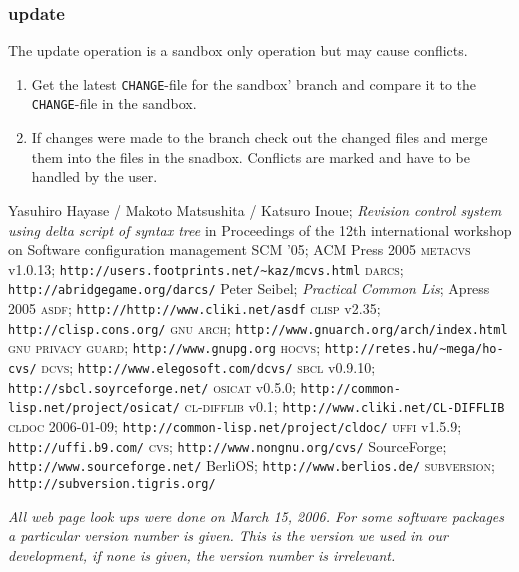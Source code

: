 \documentclass[fleqn, 10pt, a4paper]{report} \usepackage{amssymb}
\begin{document}
\subsubsection{update}

The update operation is a sandbox only operation but may cause
conflicts.

\begin{enumerate}
\item Get the latest \texttt{CHANGE}-file for the sandbox' branch and
  compare it to the \texttt{CHANGE}-file in the sandbox.
\item If changes were made to the branch check out the changed files
  and merge them into the files in the snadbox. Conflicts are marked
  and have to be handled by the user.
\end{enumerate}


\begin{thebibliography}{Clis06}
 Yasuhiro Hayase / Makoto Matsushita / Katsuro
  Inoue; \emph{Revision control system using delta script of syntax
    tree} in Proceedings of the 12th international workshop on
  Software configuration management SCM '05; ACM Press 2005
 \textsc{metacvs} v1.0.13;
  \texttt{http://users.footprints.net/\textasciitilde{}kaz/mcvs.html}
 \textsc{darcs};
  \texttt{http://abridgegame.org/darcs/}
 Peter Seibel; \emph{Practical Common Lis};
  Apress 2005
 \textsc{asdf};
  \texttt{http://http://www.cliki.net/asdf}
 \textsc{clisp} v2.35;
  \texttt{http://clisp.cons.org/}
 \textsc{gnu arch};
  \texttt{http://www.gnuarch.org/arch/index.html}
 \textsc{gnu privacy guard};
  \texttt{http://www.gnupg.org}
 \textsc{hocvs};
  \texttt{http://retes.hu/\textasciitilde{}mega/ho-cvs/}
 \textsc{dcvs};
  \texttt{http://www.elegosoft.com/dcvs/}
 \textsc{sbcl} v0.9.10;
  \texttt{http://sbcl.soyrceforge.net/}
 \textsc{osicat} v0.5.0;
  \texttt{http://common-lisp.net/project/osicat/}
 \textsc{cl-difflib} v0.1;
  \texttt{http://www.cliki.net/CL-DIFFLIB}
 \textsc{cldoc} 2006-01-09;
  \texttt{http://common-lisp.net/project/cldoc/}
 \textsc{uffi} v1.5.9;
  \texttt{http://uffi.b9.com/}
 \textsc{cvs};
  \texttt{http://www.nongnu.org/cvs/}
 SourceForge;
  \texttt{http://www.sourceforge.net/}
 BerliOS;
  \texttt{http://www.berlios.de/}
 \textsc{subversion};
  \texttt{http://subversion.tigris.org/}
\end{thebibliography}

\emph{All web page look ups were done on March 15, 2006.
For some software packages a particular version number is given. This is
the version we used in our development, if none is given, the version number
is irrelevant.}
\end{document}
